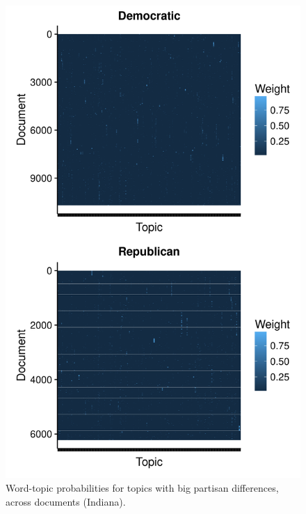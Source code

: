 \documentclass[11pt]{article}
\begin{document}
\begin{figure}[!ht]
	\centering %
	\caption{Word-topic probabilities for topics with big partisan differences, across documents (Indiana).}
	\label{heatmaps_weights}
	\includegraphics[width=\linewidth]{figures/heatmaps_weights_IN.png}
\end{figure}
\end{document}

